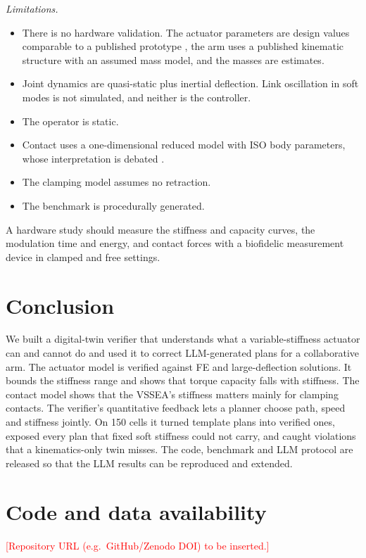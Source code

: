 \documentclass[journal]{IEEEtran}
\newcommand{\todo}[1]{\textcolor{red}{[#1]}}
\begin{document}
\emph{Limitations.}
\begin{itemize}
\item There is no hardware validation. The actuator parameters are design values comparable to a published prototype \cite{sariyildiz2023}, the arm uses a published kinematic structure with an assumed mass model, and the masses are estimates.
\item Joint dynamics are quasi-static plus inertial deflection. Link oscillation in soft modes is not simulated, and neither is the controller.
\item The operator is static.
\item Contact uses a one-dimensional reduced model with ISO body parameters, whose interpretation is debated \cite{kirschner2022}.
\item The clamping model assumes no retraction.
\item The benchmark is procedurally generated.
\end{itemize}
A hardware study should measure the stiffness and capacity curves, the modulation time and energy, and contact forces with a biofidelic measurement device in clamped and free settings.

\section{Conclusion}
We built a digital-twin verifier that understands what a variable-stiffness actuator can and cannot do and used it to correct LLM-generated plans for a collaborative arm. The actuator model is verified against FE and large-deflection solutions. It bounds the stiffness range and shows that torque capacity falls with stiffness. The contact model shows that the VSSEA's stiffness matters mainly for clamping contacts. The verifier's quantitative feedback lets a planner choose path, speed and stiffness jointly. On 150 cells it turned template plans into verified ones, exposed every plan that fixed soft stiffness could not carry, and caught violations that a kinematics-only twin misses. The code, benchmark and LLM protocol are released so that the LLM results can be reproduced and extended.

\section*{Code and data availability}
\todo{Repository URL (e.g.\ GitHub/Zenodo DOI) to be inserted.}
\end{document}
